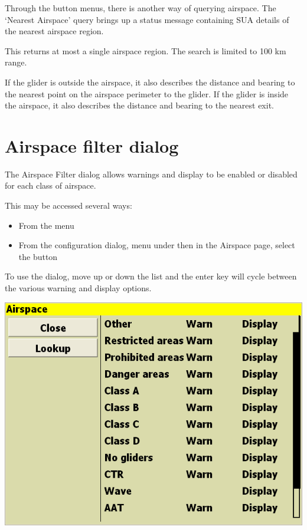\documentclass[a4paper,12pt]{refrep}
\begin{document}
Through the button menus, there is another way of querying airspace.
The `Nearest Airspace' query brings up a status message containing SUA
details of the nearest airspace region. 
\begin{quote}
\blink{}
\end{quote}
This returns at most a single airspace region.  The search is limited
to 100 km range.

If the glider is outside the airspace, it also describes the distance
and bearing to the nearest point on the airspace perimeter to the
glider.  If the glider is inside the airspace, it also describes the
distance and bearing to the nearest exit.

\section{Airspace filter dialog}\label{sec:airsp-filt-dial}

The Airspace Filter dialog allows warnings and display to be enabled
or disabled for each class of airspace.  

This may be accessed several ways:
\begin{itemize}
\item From the menu \blink{}
\item From the configuration dialog, menu under
\blink{} then in the Airspace page, select the
button 
\end{itemize}

To use the dialog, move up or down the list and the enter key will
cycle between the various warning and display options.

\begin{center}
\includegraphics[angle=0,width=\linewidth,keepaspectratio='true']{figures/airspacefilter.png}
\end{center}
\end{document}
